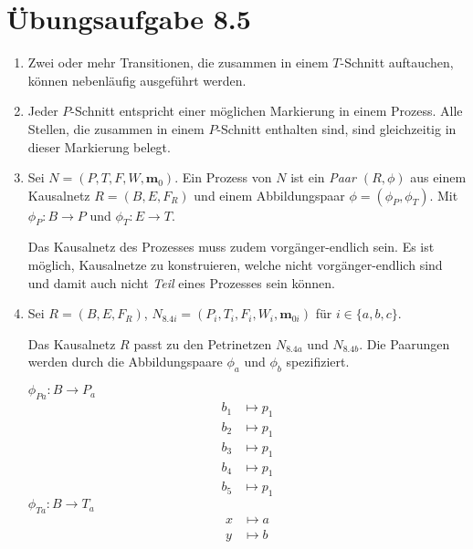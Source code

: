 \documentclass[a4paper]{scrartcl}
\begin{document}
\section*{Übungsaufgabe 8.5} 
\begin{enumerate}
    \item
        Zwei oder mehr Transitionen, die zusammen in einem $T$-Schnitt
        auftauchen, können nebenläufig ausgeführt werden.

    \item
        Jeder $P$-Schnitt entspricht einer möglichen Markierung in einem
        Prozess.
        Alle Stellen, die zusammen in einem $P$-Schnitt enthalten sind,
        sind gleichzeitig in dieser Markierung belegt.

    \item
        Sei $N = (P,T,F,W,\textbf{m}_0)$.
        Ein Prozess von $N$ ist ein \emph{Paar $(R, \phi)$} aus einem
        Kausalnetz $R = (B, E, F_R)$ und einem Abbildungspaar
        $\phi = (\phi_P, \phi_T)$.
        Mit $\phi_P \colon B \to P$ und $\phi_T \colon E \to T$.

        Das Kausalnetz des Prozesses muss zudem vorgänger-endlich sein.
        Es ist möglich, Kausalnetze zu konstruieren, welche nicht
        vorgänger-endlich sind und damit auch nicht \emph{Teil} eines Prozesses
        sein können.

    \item
        Sei $R = (B,E,F_R)$, $N_{8.4i} = (P_i,T_i,F_i,W_i,\textbf{m}_{0i})$ für
        $i \in \{ a,b,c \}$.

        Das Kausalnetz $R$ passt zu den Petrinetzen $N_{8.4a}$ und $N_{8.4b}$.
        Die Paarungen werden durch die Abbildungspaare $\phi_a$ und $\phi_b$
        spezifiziert.

        $\phi_{Pa} \colon B \to P_a$
        \begin{equation}
            \begin{split}
                b_1 &\mapsto p_1 \\
                b_2 &\mapsto p_1 \\
                b_3 &\mapsto p_1 \\
                b_4 &\mapsto p_1 \\
                b_5 &\mapsto p_1
            \end{split}
        \end{equation}
        $\phi_{Ta} \colon B \to T_a$
        \begin{equation}
            \begin{split}
                x &\mapsto a \\
                y &\mapsto b
            \end{split}
        \end{equation}


\end{enumerate}
\end{document}

